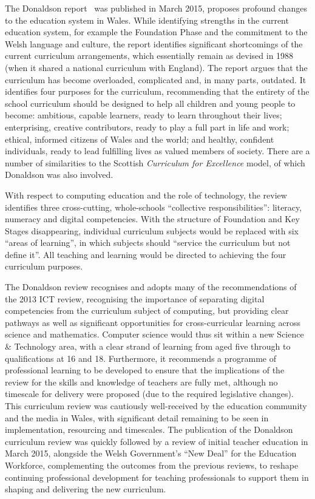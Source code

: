 \documentclass{llncs}
\begin{document}
The Donaldson report~\cite{Donaldson:2015} was published in March
2015, proposes profound changes to the education system in
Wales. While identifying strengths in the current education system,
for example the Foundation Phase and the commitment to the Welsh
language and culture, the report identifies significant shortcomings
of the current curriculum arrangements, which essentially remain as
devised in 1988 (when it shared a national curriculum with
England). The report argues that the curriculum has become overloaded,
complicated and, in many parts, outdated. It identifies four purposes
for the curriculum, recommending that the entirety of the school
curriculum should be designed to help all children and young people to
become: ambitious, capable learners, ready to learn throughout their
lives; enterprising, creative contributors, ready to play a full part
in life and work; ethical, informed citizens of Wales and the world;
and healthy, confident individuals, ready to lead fulfilling lives as
valued members of society. There are a number of similarities to the
Scottish {\emph{Curriculum for Excellence}}
model, of which Donaldson was also involved.

With respect to computing education and the role of technology, the
review identifies three cross-cutting, whole-schools ``collective
responsibilities'': literacy, numeracy and digital competencies. With
the structure of Foundation and Key Stages disappearing, individual
curriculum subjects would be replaced with six ``areas of learning'',
in which subjects should ``service the curriculum but not define
it''. All teaching and learning would be directed to achieving the
four curriculum purposes.

The Donaldson review recognises and adopts many of the recommendations
of the 2013 ICT review, recognising the importance of separating
digital competencies from the curriculum subject of computing, but
providing clear pathways as well as significant opportunities for
cross-curricular learning across science and mathematics. Computer
science would thus sit within a new Science \& Technology area, with a
clear strand of learning from aged five through to qualifications at
16 and 18. Furthermore, it recommends a programme of professional
learning to be developed to ensure that the implications of the review
for the skills and knowledge of teachers are fully met, although no
timescale for delivery were proposed (due to the required legislative
changes). This curriculum review was cautiously well-received by the
education community and the media in Wales, with significant detail
remaining to be seen in implementation, resourcing and timescales. The
publication of the Donaldson curriculum review was quickly followed by
a review of initial teacher education in March 2015, alongside the
Welsh Government's ``New Deal'' for the Education Workforce,
complementing the outcomes from the previous reviews, to reshape
continuing professional development for teaching professionals to
support them in shaping and delivering the new curriculum.
\end{document}
